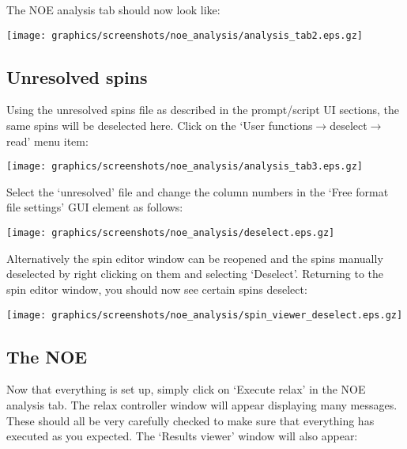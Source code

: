 The NOE analysis tab should now look like:

\begin{minipage}[h]{\linewidth}
\centerline{\texttt{[image: graphics/screenshots/noe\_analysis/analysis\_tab2.eps.gz]}}
\end{minipage}



\subsection{Unresolved spins}

Using the unresolved spins file as described in the prompt/script UI sections, the same spins will be deselected here.  Click on the `User functions$\to$deselect$\to$read' menu item:

\begin{minipage}[h]{\linewidth}
\centerline{\texttt{[image: graphics/screenshots/noe\_analysis/analysis\_tab3.eps.gz]}}
\end{minipage}

Select the `unresolved' file and change the column numbers in the `Free format file settings' GUI element as follows: 

\begin{minipage}[h]{\linewidth}
\centerline{\texttt{[image: graphics/screenshots/noe\_analysis/deselect.eps.gz]}}
\end{minipage}

Alternatively the spin editor window can be reopened and the spins manually deselected by right clicking on them and selecting `Deselect'.  Returning to the spin editor window, you should now see certain spins deselect:

\begin{minipage}[h]{\linewidth}
\centerline{\texttt{[image: graphics/screenshots/noe\_analysis/spin\_viewer\_deselect.eps.gz]}}
\end{minipage}



\subsection{The NOE}

Now that everything is set up, simply click on `Execute relax' in the NOE analysis tab.  The relax controller window will appear displaying many messages.  These should all be very carefully checked to make sure that everything has executed as you expected.  The `Results viewer' window will also appear:

